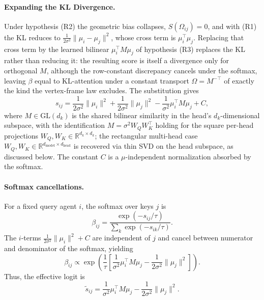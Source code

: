 \documentclass[11pt]{article}
\begin{document}
\paragraph{Expanding the KL Divergence.}
Under hypothesis (R2) the geometric bias collapses, $S(\Omega_{ij}) = 0$, and with (R1) the KL reduces to $\frac{1}{2\sigma^2}\|\mu_i - \mu_j\|^2$, whose cross term is $\mu_i^\top\mu_j$. Replacing that cross term by the learned bilinear $\mu_i^\top M \mu_j$ of hypothesis (R3) replaces the KL rather than reducing it: the resulting score is itself a divergence only for orthogonal $M$, although the row-constant discrepancy cancels under the softmax, leaving $\beta$ equal to KL-attention under a constant transport $\Omega = M^{-\top}$ of exactly the kind the vertex-frame law excludes. The substitution gives
\begin{equation}
s_{ij} = \frac{1}{2\sigma^2}\|\mu_i\|^2 + \frac{1}{2\sigma^2}\|\mu_j\|^2 - \frac{1}{\sigma^2}\mu_i^\top M \mu_j + C,
\end{equation}
where $M \in \mathrm{GL}(d_k)$ is the shared bilinear similarity in the head's $d_k$-dimensional subspace, with the identification $M = \sigma^2 W_Q W_K^\top$ holding for the square per-head projections $W_Q, W_K \in \mathbb{R}^{d_k \times d_k}$; the rectangular multi-head case $W_Q, W_K \in \mathbb{R}^{d_{\text{model}}\times d_{\text{head}}}$ is recovered via thin SVD on the head subspace, as discussed below. The constant $C$ is a $\mu$-independent normalization absorbed by the softmax.

\paragraph{Softmax cancellations.}
For a fixed query agent $i$, the softmax over keys $j$ is
\begin{equation}
\beta_{ij} = \frac{\exp(-s_{ij}/\tau)}{\sum_k \exp(-s_{ik}/\tau)}.
\end{equation}
The $i$-terms $\frac{1}{2\sigma^2}\|\mu_i\|^2 + C$ are independent of $j$ and cancel between numerator and denominator of the softmax, yielding
\begin{equation}
\beta_{ij} \propto \exp\left(\frac{1}{\tau}\left[\frac{1}{\sigma^2}\mu_i^\top M \mu_j - \frac{1}{2\sigma^2}\|\mu_j\|^2\right]\right).
\end{equation}
Thus, the effective logit is
\begin{equation}
\tilde{s}_{ij} = \frac{1}{\sigma^2}\mu_i^\top M \mu_j - \frac{1}{2\sigma^2}\|\mu_j\|^2.
\end{equation}
\end{document}
